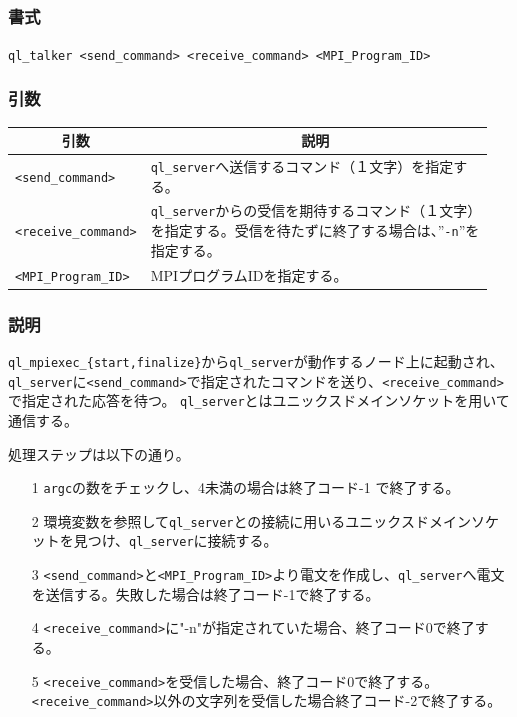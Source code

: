 \documentclass[twoside,11pt,fleqn]{book}
\begin{document}
\subsection{}
\subsubsection*{書式}{\quad} \texttt{ql\_talker <send\_command> <receive\_command> <MPI\_Program\_ID>}
\subsubsection*{引数}{\quad}
\begin{table}[!ht]
\footnotesize
\begin{tabular}{|p{0.20\linewidth}|p{0.75\linewidth}|} \hline
\multicolumn{1}{|c}{\textbf{引数}}&\multicolumn{1}{|c|}{\textbf{説明}}\\ \hline \hline
\texttt{<send\_command>}&\texttt{ql\_server}へ送信するコマンド（１文字）を指定する。\\ \hline
\texttt{<receive\_command>}&\texttt{ql\_server}からの受信を期待するコマンド（１文字）を指定する。受信を待たずに終了する場合は、''\texttt{-n}''を指定する。\\ \hline
\texttt{<MPI\_Program\_ID>}&MPIプログラムIDを指定する。\\ \hline
\end{tabular}
\vspace{-0em}
\end{table}
\FloatBarrier

\subsubsection*{説明}{\quad}
\texttt{ql\_mpiexec\_\{start,finalize\}}から\texttt{ql\_server}が動作するノード上に起動され、\texttt{ql\_server}に\texttt{<send\_command>}で指定されたコマンドを送り、\texttt{<receive\_command>}で指定された応答を待つ。
\texttt{ql\_server}とはユニックスドメインソケットを用いて通信する。

処理ステップは以下の通り。
\begin{itemize}
\item[1]\texttt{argc}の数をチェックし、4未満の場合は終了コード-1 で終了する。
\item[2]環境変数を参照して\texttt{ql\_server}との接続に用いるユニックスドメインソケットを見つけ、\texttt{ql\_server}に接続する。
\item[3]\texttt{<send\_command>}と\texttt{<MPI\_Program\_ID>}より電文を作成し、\texttt{ql\_server}へ電文を送信する。失敗した場合は終了コード-1で終了する。
\item[4]\texttt{<receive\_command>}に"-n"が指定されていた場合、終了コード0で終了する。
\item[5]\texttt{<receive\_command>}を受信した場合、終了コード0で終了する。
\texttt{<receive\_command>}以外の文字列を受信した場合終了コード-2で終了する。
\end{itemize}
\end{document}
